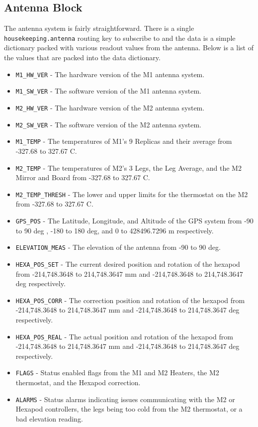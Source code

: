 \subsection{Antenna Block}
The antenna system is fairly straightforward. 
There is a single \texttt{housekeeping.antenna} routing key to subscribe to and the data is a simple dictionary packed with various readout values from the antenna.
Below is a list of the values that are packed into the data dictionary. 
\begin{itemize}
    \item \texttt{M1\_HW\_VER} - The hardware version of the M1 antenna system.
    \item \texttt{M1\_SW\_VER} - The software version of the M1 antenna system.
    \item \texttt{M2\_HW\_VER} - The hardware version of the M2 antenna system.
    \item \texttt{M2\_SW\_VER} - The software version of the M2 antenna system.
    \item \texttt{M1\_TEMP} - The temperatures of M1's 9 Replicas and their average from -327.68 to 327.67 C. 
    \item \texttt{M2\_TEMP} - The temperatures of M2's 3 Legs, the Leg Average, and the M2 Mirror and Board from -327.68 to 327.67 C.
    \item \texttt{M2\_TEMP\_THRESH} - The lower and upper limits for the thermostat on the M2 from -327.68 to 327.67 C.
    \item \texttt{GPS\_POS} - The Latitude, Longitude, and Altitude of the GPS system from -90 to 90 deg , -180 to 180 deg, and 0 to 428496.7296 m respectively.
    \item \texttt{ELEVATION\_MEAS} - The elevation of the antenna from -90 to 90 deg.
    \item \texttt{HEXA\_POS\_SET} - The current desired position and rotation of the hexapod from -214,748.3648 to 214,748.3647 mm and -214,748.3648 to 214,748.3647 deg respectively.
    \item \texttt{HEXA\_POS\_CORR} - The correction position and rotation of the hexapod from -214,748.3648 to 214,748.3647 mm and -214,748.3648 to 214,748.3647 deg respectively.
    \item \texttt{HEXA\_POS\_REAL} - The actual position and rotation of the hexapod from -214,748.3648 to 214,748.3647 mm and -214,748.3648 to 214,748.3647 deg respectively.
    \item \texttt{FLAGS} - Status enabled flags from the M1 and M2 Heaters, the M2 thermostat, and the Hexapod correction. 
    \item \texttt{ALARMS} - Status alarms indicating issues communicating with the M2 or Hexapod controllers, the legs being too cold from the M2 thermostat, or a bad elevation reading.
\end{itemize}

